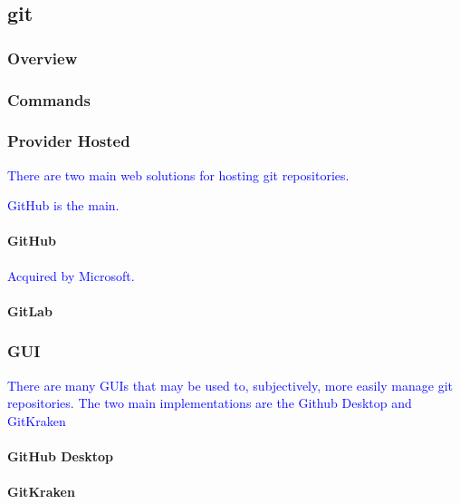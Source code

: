 \subsection{git}

\subsubsection{Overview}

\subsubsection{Commands}

\subsubsection{Provider Hosted}

\textcolor{blue}{There are two main web solutions for hosting git repositories.}

\textcolor{blue}{GitHub is the main.}


\paragraph{GitHub}

\textcolor{blue}{Acquired by Microsoft.}

\paragraph{GitLab}


\subsubsection{GUI}

\textcolor{blue}{There are many GUIs that may be used to, subjectively, more easily manage git repositories. The two main implementations are the Github Desktop and GitKraken}

\paragraph{GitHub Desktop}

\paragraph{GitKraken}
